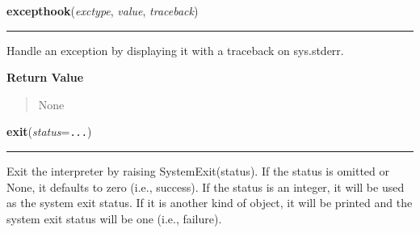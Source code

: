     \label{sys:excepthook}

    \vspace{0.5ex}

\hspace{.8\funcindent}\begin{boxedminipage}{\funcwidth}

    \raggedright \textbf{excepthook}(\textit{exctype}, \textit{value}, \textit{traceback})

    \vspace{-1.5ex}

    \rule{\textwidth}{0.5\fboxrule}
\setlength{\parskip}{2ex}
    Handle an exception by displaying it with a traceback on sys.stderr.

\setlength{\parskip}{1ex}
      \textbf{Return Value}
    \vspace{-1ex}

      \begin{quote}
      None

      \end{quote}

    \end{boxedminipage}

    \label{sys:exit}

    \vspace{0.5ex}

\hspace{.8\funcindent}\begin{boxedminipage}{\funcwidth}

    \raggedright \textbf{exit}(\textit{status}={\tt ...})

    \vspace{-1.5ex}

    \rule{\textwidth}{0.5\fboxrule}
\setlength{\parskip}{2ex}
    Exit the interpreter by raising SystemExit(status). If the status is 
    omitted or None, it defaults to zero (i.e., success). If the status is 
    an integer, it will be used as the system exit status. If it is another
    kind of object, it will be printed and the system exit status will be 
    one (i.e., failure).

\setlength{\parskip}{1ex}
    \end{boxedminipage}

    \label{sys:getcheckinterval}

    \vspace{0.5ex}

